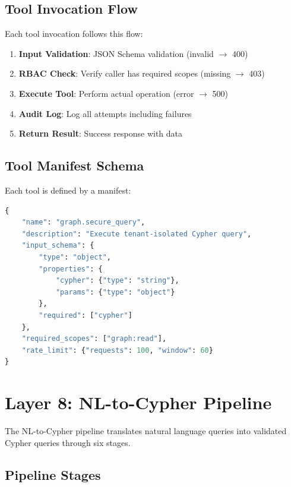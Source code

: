\documentclass[a4paper,twoside]{sapthesis}
\begin{document}
\subsection{Tool Invocation Flow}
\label{subsec:tool-invocation}

Each tool invocation follows this flow:

\begin{enumerate}
    \item \textbf{Input Validation}: JSON Schema validation (invalid $\rightarrow$ 400)
    \item \textbf{RBAC Check}: Verify caller has required scopes (missing $\rightarrow$ 403)
    \item \textbf{Execute Tool}: Perform actual operation (error $\rightarrow$ 500)
    \item \textbf{Audit Log}: Log all attempts including failures
    \item \textbf{Return Result}: Success response with data
\end{enumerate}

\subsection{Tool Manifest Schema}
\label{subsec:tool-manifest}

Each tool is defined by a manifest:

\begin{lstlisting}[language=Python, caption={Tool manifest example}]
{
    "name": "graph.secure_query",
    "description": "Execute tenant-isolated Cypher query",
    "input_schema": {
        "type": "object",
        "properties": {
            "cypher": {"type": "string"},
            "params": {"type": "object"}
        },
        "required": ["cypher"]
    },
    "required_scopes": ["graph:read"],
    "rate_limit": {"requests": 100, "window": 60}
}
\end{lstlisting}

\section{Layer 8: NL-to-Cypher Pipeline}
\label{sec:layer8-nl2cypher}

The NL-to-Cypher pipeline translates natural language queries into validated Cypher queries through six stages.

\subsection{Pipeline Stages}
\label{subsec:pipeline-stages}
\end{document}
